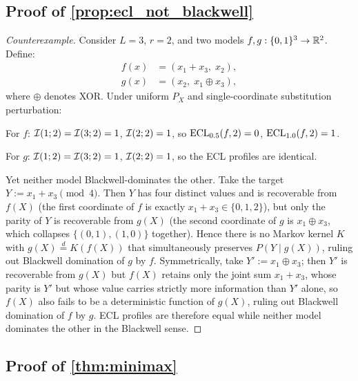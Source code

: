 \subsection{Proof of \texorpdfstring{\cref{prop:ecl_not_blackwell}}{Proposition: ECL ordering does not imply Blackwell dominance}}

\begin{proof}[Counterexample]
Consider $L=3$, $r=2$, and two models $f,g:\{0,1\}^3 \to \mathbb{R}^2$. Define:
\begin{align*}
f(x) &= (x_1 + x_3,\; x_2), \\
g(x) &= (x_2,\; x_1 \oplus x_3),
\end{align*}
where $\oplus$ denotes XOR. Under uniform $P_X$ and single-coordinate substitution perturbation:

For $f$: $\mathcal{I}(1;2) = \mathcal{I}(3;2) = 1$, $\mathcal{I}(2;2) = 1$, so $\mathrm{ECL}_{0.5}(f,2) = 0$, $\mathrm{ECL}_{1.0}(f,2) = 1$.

For $g$: $\mathcal{I}(1;2) = \mathcal{I}(3;2) = 1$, $\mathcal{I}(2;2) = 1$, so the ECL profiles are identical.

Yet neither model Blackwell-dominates the other. Take the target $Y := x_1 + x_3 \pmod 4$. Then $Y$ has four distinct values and is recoverable from $f(X)$ (the first coordinate of $f$ is exactly $x_1 + x_3 \in \{0,1,2\}$), but only the parity of $Y$ is recoverable from $g(X)$ (the second coordinate of $g$ is $x_1 \oplus x_3$, which collapses $\{(0,1),(1,0)\}$ together). Hence there is no Markov kernel $K$ with $g(X) \stackrel{d}{=} K(f(X))$ that simultaneously preserves $P(Y \mid g(X))$, ruling out Blackwell domination of $g$ by $f$. Symmetrically, take $Y' := x_1 \oplus x_3$; then $Y'$ is recoverable from $g(X)$ but $f(X)$ retains only the joint sum $x_1 + x_3$, whose parity is $Y'$ but whose value carries strictly more information than $Y'$ alone, so $f(X)$ also fails to be a deterministic function of $g(X)$, ruling out Blackwell domination of $f$ by $g$. ECL profiles are therefore equal while neither model dominates the other in the Blackwell sense.
\end{proof}

\subsection{Proof of \texorpdfstring{\cref{thm:minimax}}{Theorem: Sample-Complexity Lower Bound}}

